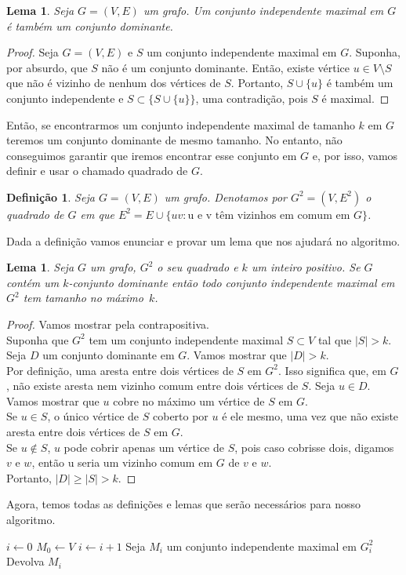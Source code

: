 \documentclass[12pt]{article}
\newtheorem{lemma}[theorem]{Lema}
\newtheorem{definition}[theorem]{Definição}
\begin{document}
\begin{lemma}\label{lemma:2.8}
    Seja $G = (V,E)$ um grafo. Um conjunto independente maximal em $G$ é também um conjunto dominante.
\end{lemma}
\begin{proof}
    Seja $G = (V,E)$ e $S$ um conjunto independente maximal em $G$. Suponha, por absurdo, que $S$ não é um conjunto dominante. Então, existe vértice $u \in V \setminus S$ que não é vizinho de nenhum dos vértices de $S$. Portanto, $S \cup \{u\}$ é também um conjunto independente e $S \subset \{S \cup \{u\}\}$, uma contradição, pois $S$ é maximal.
\end{proof}
Então, se encontrarmos um conjunto independente maximal de tamanho $k$ em $G$ teremos um conjunto dominante de mesmo tamanho. No entanto, não conseguimos garantir que iremos encontrar esse conjunto em $G$ e, por isso, vamos definir e usar o chamado quadrado de $G$.
\begin{definition}
    Seja $G= (V,E)$ um grafo. Denotamos por $G^2 = (V,E^2)$ o \emph{quadrado} de $G$ em que $E^2 = E \cup \{uv: \text{u e v têm vizinhos em comum em $G$}\}$.
\end{definition}
Dada a definição vamos enunciar e provar um lema que nos ajudará no algoritmo.
\begin{lemma}\label{lemma:2.10}
    Seja $G$ um grafo, $G^2$ o seu quadrado e $k$ um inteiro positivo. Se $G$ contém um $k$-conjunto dominante então todo conjunto independente maximal em $G^2$ tem tamanho no máximo~$k$.
\end{lemma}
\begin{proof}
    Vamos mostrar pela contrapositiva.\\
    Suponha que $G^2$ tem um conjunto independente maximal $S \subset V$ tal que $|S| > k$. Seja $D$ um conjunto dominante em $G$. Vamos mostrar que $|D| > k$. \\
    Por definição, uma aresta entre dois vértices de $S$ em $G^2$. Isso significa que, em $G$, não existe aresta nem vizinho comum entre dois vértices de $S$. Seja $u \in D$. Vamos mostrar que $u$ cobre no máximo um vértice de $S$ em $G$. \\
    Se $u \in S$, o único vértice de $S$ coberto por $u$ é ele mesmo, uma vez que não existe aresta entre dois vértices de $S$ em $G$. \\
    Se $u \not \in S$, $u$ pode cobrir apenas um vértice de $S$, pois caso cobrisse dois, digamos $v$ e $w$, então u seria um vizinho comum em $G$ de $v$ e $w$.\\
    Portanto, $|D| \geq |S| > k$.
\end{proof}
Agora, temos todas as definições e lemas que serão necessários para nosso algoritmo.
\begin{algorithm}
    \begin{algorithmic}[1]
        \State $i \leftarrow 0$
        \State $M_0 \leftarrow V$
            \State $i\leftarrow i + 1$
            \State Seja $M_i$ um conjunto independente maximal em $G_i^2$
        \EndWhile
        \State Devolva $M_i$
        \EndFunction
    \end{algorithmic}
\end{algorithm}
\end{document}
